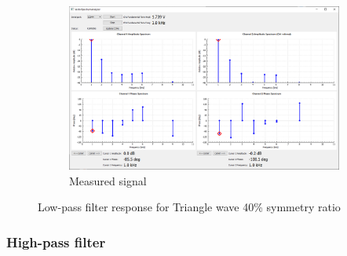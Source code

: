 \documentclass[notitlepage, a4paper, 11pt]{article}
\begin{document}
\begin{figure}[H]
\begin{subfigure}[][][t]{0.45\textwidth}
			\includegraphics[width=\textwidth, trim=10 80 10 100, clip]{../img/Circuit1/trig40}
			\caption{Measured signal}
		\end{subfigure}
		\caption{Low-pass filter response for Triangle wave 40\% symmetry ratio}
	\end{figure}


	
	\subsubsection{High-pass filter}
\end{document}
